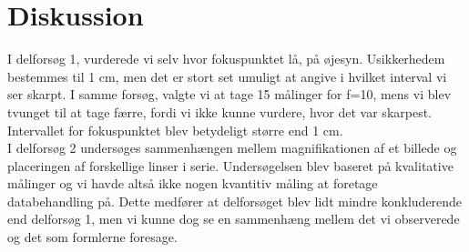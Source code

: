 \section{Diskussion}
I delforsøg 1, vurderede vi selv hvor fokuspunktet lå, på øjesyn. Usikkerhedem bestemmes til 1 cm, men det er stort set umuligt at angive i hvilket interval vi ser skarpt. I samme forsøg, valgte vi at tage 15 målinger for f=10, mens vi blev tvunget til at tage færre, fordi vi ikke kunne vurdere, hvor det var skarpest. Intervallet for fokuspunktet blev betydeligt større end 1 cm.
\\ I delforsøg 2 undersøges sammenhængen mellem magnifikationen af et billede og placeringen af forskellige linser i serie. Undersøgelsen blev baseret på kvalitative målinger og vi havde altså ikke nogen kvantitiv måling at foretage databehandling på. Dette medfører at delforsøget blev lidt mindre konkluderende end delforsøg 1, men vi kunne dog se en sammenhæng mellem det vi observerede og det som formlerne foresage.
